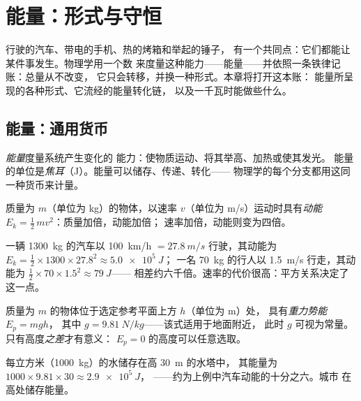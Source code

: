 \chapter{能量：形式与守恒}\label{ch:g10:energy-conservation}

行驶的汽车、带电的手机、热的烤箱和举起的锤子，
有一个共同点：它们都能让某件事发生。物理学用一个数
来度量这种能力——能量——并依照一条铁律记账：总量从不改变，
它只会转移，并换一种形式。本章将打开这本账：
能量所呈现的各种形式、它流经的能量转化链，
以及一千瓦时能做些什么。

\section{能量：通用货币}

\begin{definition}[能量与焦耳]\label{def:g10:energy-conservation:energy}
\emph{能量}度量系统产生变化的
能力：使物质运动、将其举高、加热或使其发光。
能量的单位是\emph{焦耳}（\unit{J}）。能量可以储存、传递、转化——
物理学的每个分支都用这同一种货币来计量。
\end{definition}

\begin{definition}[动能]\label{def:g10:energy-conservation:kinetic}
质量为 $m$（单位为 \unit{kg}）的物体，以速率 $v$（单位为
\unit{m/s}）运动时具有\emph{动能}
$E_k = \tfrac12\, m v^2$：质量加倍，动能加倍；
速率加倍，动能则变为四倍。
\end{definition}

\begin{example}[汽车与行人]\label{ex:g10:energy-conservation:kinetic}
一辆 \qty{1300}{kg} 的汽车以 \qty{100}{km/h} $= \qty{27.8}{m/s}$ 行驶，其动能为
$E_k = \tfrac12 \times 1300 \times 27.8^2 \approx \qty{5.0e5}{J}$；
一名 \qty{70}{kg} 的行人以 \qty{1.5}{m/s} 行走，其动能为
$\tfrac12 \times 70 \times 1.5^2 \approx \qty{79}{J}$——
相差约六千倍。速率的代价很高：平方关系决定了这一点。
\end{example}

\begin{definition}[重力势能]\label{def:g10:energy-conservation:potential}
质量为 $m$ 的物体位于选定参考平面上方 $h$（单位为 \unit{m}）处，
具有\emph{重力势能}
$E_p = m g h$，
其中 $g = \qty{9.81}{N/kg}$——该式适用于地面附近，
此时 $g$ 可视为常量。只有高度\emph{之差}才有意义：
$E_p = 0$ 的高度可以任意选取。
\end{definition}

\begin{example}[水塔]\label{ex:g10:energy-conservation:potential}
每立方米（\qty{1000}{kg}）的水储存在高 \qty{30}{m} 的水塔中，
其能量为 $1000 \times 9.81 \times 30 \approx \qty{2.9e5}{J}$，
——约为上例中汽车动能的十分之六。城市
在高处储存能量。
\end{example}

